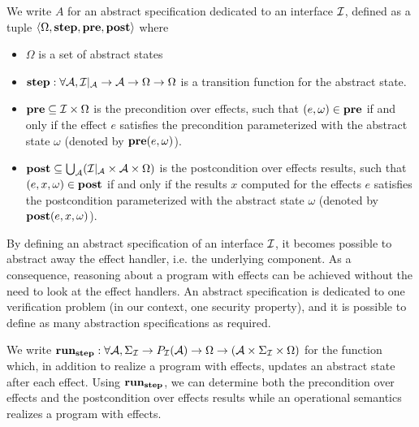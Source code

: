 \begin{definition} \label{def:freespec:abstract-specs}
  We write $A$ for an abstract specification dedicated to an interface $\mathcal{I}$,
  defined as a tuple $\langle \Omega, \mathbf{\mathbf{step}}, \mathbf{\mathbf{pre}}, \mathbf{\mathbf{post}}
  \rangle$ where
  \begin{itemize}
  \item $\Omega$ is a set of abstract states
  \item $\mathbf{\mathbf{step}} : \forall \mathcal{A}, \mathcal{I}|_{\mathcal{A}}
    \rightarrow \mathcal{A} \rightarrow \Omega \rightarrow \Omega$
  is a transition function for the abstract state.
  \item $\mathbf{\mathbf{pre}} \subseteq \mathcal{I} \times \Omega$ is the precondition over
  effects, such that $(e, \omega) \in \mathbf{\mathbf{pre}}$ if and only if the effect $e$
  satisfies the precondition parameterized with the abstract state $\omega$
  (denoted by $\mathbf{\mathbf{pre}}(e, \omega)$).
  \item $\mathbf{\mathbf{post}} \subseteq \bigcup_{\mathcal{A}}
    (\mathcal{I}|_{\mathcal{A}} \times \mathcal{A} \times \Omega)$ is the
    postcondition over effects results, such that $(e, x, \omega) \in
    \mathbf{\mathbf{post}}$ if and only if the results $x$ computed for the effects $e$
    satisfies the postcondition parameterized with the abstract state $\omega$
    (denoted by $\mathbf{\mathbf{post}}(e, x, \omega)$).
  \end{itemize}
\end{definition}

By defining an abstract specification of an interface $\mathcal{I}$, it becomes possible
to abstract away the effect handler, i.e. the underlying component.
%
As a consequence, reasoning about a program with effects can be achieved without
the need to look at the effect handlers.
%
An abstract specification is dedicated to one verification problem (in our
context, one security property), and it is possible to define as many
abstraction specifications as required.

We write $\mathbf{\mathbf{run}}_{\mathbf{\mathbf{step}}} : \forall \mathcal{A}, \Sigma_{\mathcal{I}}
\rightarrow P_{\mathcal{I}}(\mathcal{A}) \rightarrow \Omega \rightarrow (\mathcal{A}
\times \Sigma_{\mathcal{I}} \times \Omega)$ for the function which, in addition to
realize a program with effects, updates an abstract state after each effect.
%
Using $\mathbf{\mathbf{run}}_{\mathbf{\mathbf{step}}}$, we can determine both the precondition over
effects and the postcondition over effects results while an operational
semantics realizes a program with effects.

